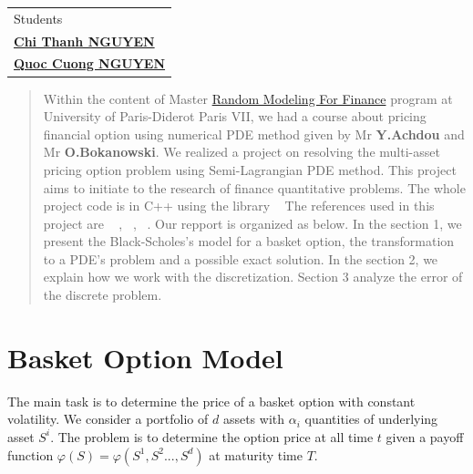 \documentclass[a4paper,10pt]{article}
\begin{document}
\begin{titlepage}
\begin{tabular}{l}
Students                                                                          \\ 
\href{mailto:chithanhnguyen.math@gmail.com}{\LARGE{\textbf{Chi Thanh NGUYEN}}}    \\
\href{mailto:nqcuong32@gmail.com}{\LARGE{\textbf{Quoc Cuong NGUYEN}}}
\end{tabular}



\vfill
\begin{abstract}
Within the content of Master \href{https://masterfinance.math.univ-paris-diderot.fr/}{Random Modeling For Finance} program at University of Paris-Diderot Paris VII, we had a course about pricing financial option using numerical PDE method given by Mr \textbf{Y.Achdou} and Mr \textbf{O.Bokanowski}. We realized a project on resolving the multi-asset pricing option problem using Semi-Lagrangian PDE method. This project aims to initiate to the research of finance quantitative problems.  The whole project code is in C++ using the library ~\cite{BokanowskiLib} The references used in this project are ~\cite{Oksendal} , ~\cite{Bokanowski}, ~\cite{Achdou}. Our repport is organized as below. In the section 1, we present the Black-Scholes's model for a basket option, the transformation to a PDE's problem and a possible exact solution. In the section 2, we explain how we work with the discretization. Section 3 analyze the error of the discrete problem.
\end{abstract}
\end{titlepage}



\section{Basket Option Model}
The main task is to determine the price of a basket option with constant volatility. We consider a portfolio of $d$ assets with $\alpha_i$ quantities of underlying asset $S^i$. The problem is to determine the option price at all time $t$ given a payoff function $\varphi(S)=\varphi(S^1,S^2...,S^d)$ at maturity time $T$.
\end{document}

